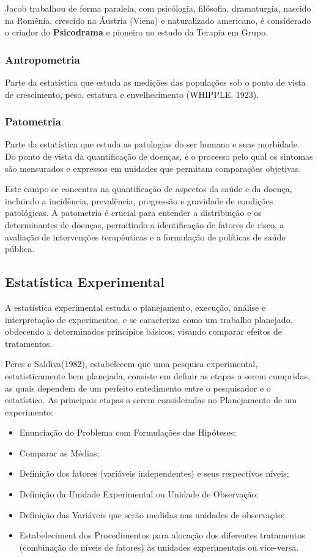 Jacob trabalhou de forma paralela, com psicólogia, filósofia, dramaturgia, nas\-ci\-do na Romênia, crescido na Áustria (Viena) e naturalizado americano, é considerado o criador do \textbf{Psicodrama} e pioneiro no estudo da Terapia em Grupo. 

\subsubsection{Antropometria}
Parte da estatística que estuda as medições das populações sob o ponto de vista de crescimento, peso, estatura e envelhecimento (WHIPPLE, 1923).

\subsubsection{Patometria}

Parte da estatística que estuda as patologias do ser humano e suas morbidade. Do ponto de vista da quantificação de doenças, é o processo pelo qual os sintomas são mensurados e expressos em unidades que permitam comparações objetivas.\vskip0.3cm

Este campo se concentra na quantificação de aspectos da saúde e da doença, incluindo a incidência, prevalência, progressão e gravidade de condições patológicas. A patometria é crucial para entender a distribuição e os determinantes de doenças, permitindo a identificação de fatores de risco, a avaliação de in\-ter\-ven\-ções terapêuticas e a formulação de políticas de saúde pública.

\subsection{Estatística Experimental}

A estatística experimental estuda o planejamento, execução, análise e interpretação de experimentos, e se caracteriza como um trabalho planejado, obdecendo a determinados princípios básicos, visando comparar efeitos de tratamentos.\vskip0.3cm

Peres e Saldiva(1982), estabelecem que uma pesquisa experimental, estatisticamente bem planejada, consiste em definir as etapas a serem cumpridas, as quais dependem de um perfeito entedimento entre o pesquisador e o estatístico. As principais etapas a serem consideradas no Planejamento de um experimento:

\newpage
\begin{itemize}
\item Enunciação do Problema com Formulações das Hipóteses;
\item Comparar as Médias;
\item Definição dos fatores (variáveis independentes) e seus respectívos níveis;
\item Definição da Unidade Experimental ou Unidade de Observação;
\item Definição das Variáveis que serão medidas nas unidades de observação;
\item Estabeleciment dos Procedimentos para alocação dos diferentes tratamentos (combinação de níveis de fatores) às unidades experimentais ou vice-versa.
\end{itemize}

